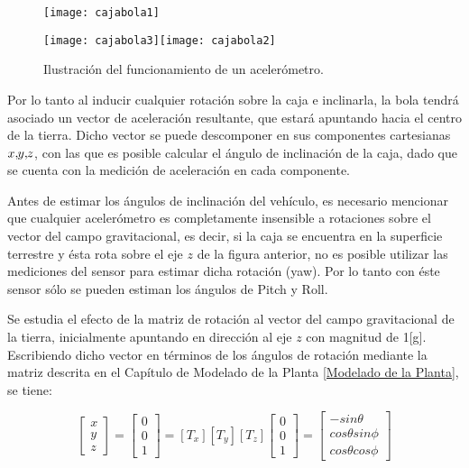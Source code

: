 \documentclass[\main/main.tex]{subfiles}
\begin{document}
\begin{figure}[H]
\noindent \begin{centering}
\texttt{[image: cajabola1]}
\par\end{centering}
\noindent \begin{centering}
\texttt{[image: cajabola3]}\texttt{[image: cajabola2]}
\par\end{centering}
\caption{Ilustración del funcionamiento de un acelerómetro.}
\end{figure}

Por lo tanto al inducir cualquier rotación sobre la caja e inclinarla,
la bola tendrá asociado un vector de aceleración resultante, que estará
apuntando hacia el centro de la tierra. Dicho vector se puede descomponer
en sus componentes cartesianas $x,\negmedspace y,\negmedspace z$,
con las que es posible calcular el ángulo de inclinación de la caja,
dado que se cuenta con la medición de aceleración en cada componente. 

Antes de estimar los ángulos de inclinación del vehículo, es necesario
mencionar que cualquier acelerómetro es completamente insensible a
rotaciones sobre el vector del campo gravitacional, es decir, si la
caja se encuentra en la superficie terrestre y ésta rota sobre el
eje $z$ de la figura anterior, no es posible utilizar las mediciones
del sensor para estimar dicha rotación (yaw). Por lo tanto con éste sensor sólo
se pueden estiman los ángulos de Pitch y Roll.

Se estudia el efecto de la matriz de rotación al vector del campo
gravitacional de la tierra, inicialmente apuntando en dirección al
eje $z$ con magnitud de 1{[}g{]}. Escribiendo dicho vector en términos
de los ángulos de rotación mediante la matriz descrita en el Capítulo
de Modelado de la Planta \ref{Modelado de la Planta}, se tiene:


\begin{equation}
\left[\begin{array}{c}
x\\
y\\
z
\end{array}\right]=\left[\begin{array}{c}
0\\
0\\
1
\end{array}\right]=[T_{x}][T_{y}][T_{z}]\left[\begin{array}{c}
0\\
0\\
1
\end{array}\right]=\left[\begin{array}{c}
-sin\theta\\
cos\theta sin\phi\\
cos\theta cos\phi
\end{array}\right]\label{eq:rotacion a gravitacional}
\end{equation}
\end{document}
